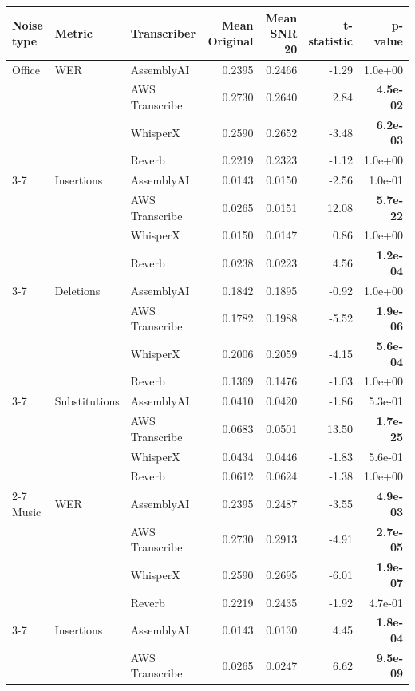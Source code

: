 \begin{tabular}{lllrrrr}
\toprule
Noise type & Metric & Transcriber & Mean Original & Mean SNR 20 & t-statistic & p-value \\
\midrule
Office & WER & AssemblyAI & 0.2395 & 0.2466 & -1.29 &  1.0e+00 \\
  &   & AWS Transcribe & 0.2730 & 0.2640 & 2.84 & \textbf{ 4.5e-02} \\
  &   & WhisperX & 0.2590 & 0.2652 & -3.48 & \textbf{ 6.2e-03} \\
  &   & Reverb & 0.2219 & 0.2323 & -1.12 &  1.0e+00 \\
\cmidrule(r){3-7}
  & Insertions & AssemblyAI & 0.0143 & 0.0150 & -2.56 &  1.0e-01 \\
  &   & AWS Transcribe & 0.0265 & 0.0151 & 12.08 & \textbf{ 5.7e-22} \\
  &   & WhisperX & 0.0150 & 0.0147 & 0.86 &  1.0e+00 \\
  &   & Reverb & 0.0238 & 0.0223 & 4.56 & \textbf{ 1.2e-04} \\
\cmidrule(r){3-7}
  & Deletions & AssemblyAI & 0.1842 & 0.1895 & -0.92 &  1.0e+00 \\
  &   & AWS Transcribe & 0.1782 & 0.1988 & -5.52 & \textbf{ 1.9e-06} \\
  &   & WhisperX & 0.2006 & 0.2059 & -4.15 & \textbf{ 5.6e-04} \\
  &   & Reverb & 0.1369 & 0.1476 & -1.03 &  1.0e+00 \\
\cmidrule(r){3-7}
  & Substitutions & AssemblyAI & 0.0410 & 0.0420 & -1.86 &  5.3e-01 \\
  &   & AWS Transcribe & 0.0683 & 0.0501 & 13.50 & \textbf{ 1.7e-25} \\
  &   & WhisperX & 0.0434 & 0.0446 & -1.83 &  5.6e-01 \\
  &   & Reverb & 0.0612 & 0.0624 & -1.38 &  1.0e+00 \\
\cmidrule(r){2-7}
Music & WER & AssemblyAI & 0.2395 & 0.2487 & -3.55 & \textbf{ 4.9e-03} \\
  &   & AWS Transcribe & 0.2730 & 0.2913 & -4.91 & \textbf{ 2.7e-05} \\
  &   & WhisperX & 0.2590 & 0.2695 & -6.01 & \textbf{ 1.9e-07} \\
  &   & Reverb & 0.2219 & 0.2435 & -1.92 &  4.7e-01 \\
\cmidrule(r){3-7}
  & Insertions & AssemblyAI & 0.0143 & 0.0130 & 4.45 & \textbf{ 1.8e-04} \\
  &   & AWS Transcribe & 0.0265 & 0.0247 & 6.62 & \textbf{ 9.5e-09} \\

\end{tabular}
